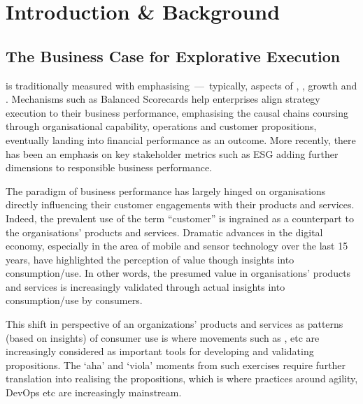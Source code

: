 \chapter*{Introduction \& Background}

\section*{The Business Case for Explorative Execution}

 is traditionally measured with  emphasising \,---\,%
typically, aspects of , , growth and .
Mechanisms such as Balanced Scorecards help enterprises align strategy execution to their
business performance, emphasising the causal chains coursing through organisational capability, operations and
customer propositions, eventually landing into financial performance as an outcome.
More recently, there has been an emphasis on key stakeholder metrics such as ESG adding further dimensions to
responsible business performance.

The paradigm of business performance has largely hinged on organisations directly influencing their customer
engagements with their products and services.
Indeed, the prevalent use of the term “customer” is ingrained as a counterpart to the organisations’
products and services.
Dramatic advances in the digital economy, especially in the area of mobile and sensor technology over the last 15 years,
have highlighted the perception of value though insights into consumption/use.
In other words, the presumed value in organisations’ products and services is increasingly validated through
actual insights into consumption/use by consumers.

This shift in perspective of an organizations’ products and services as patterns (based on insights) of consumer use
is where movements such as ,  etc are increasingly considered
as important tools for developing and validating propositions.
The ‘aha’ and ‘viola’ moments from such exercises require further translation into realising the propositions,
which is where practices around agility, DevOps etc are increasingly mainstream.

